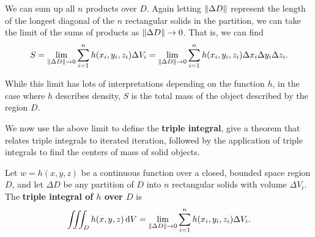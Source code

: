 We can sum up all $n$ products over $D$. Again letting $\left\lVert \Delta D \right\rVert$ represent the length of the longest diagonal of the $n$ rectangular solids in the partition, we can take the limit of the sums of products as $\left\lVert \Delta D \right\rVert\to 0$. That is, we can find
\[S = \lim_{\left\lVert \Delta D \right\rVert\to 0} \sum_{i=1}^n h(x_i,y_i,z_i)\Delta V_i=\lim_{\left\lVert \Delta D \right\rVert\to 0} \sum_{i=1}^n h(x_i,y_i,z_i)\Delta x_i\Delta y_i\Delta z_i.\]

While this limit has lots of interpretations depending on the function $h$, in the case where $h$ describes density, $S$ is the total mass of the object described by the region $D$.

We now use the above limit to define the \textbf{triple integral}, give a theorem that relates triple integrals to iterated iteration, followed by the application of triple integrals to find the centers of mass of solid objects.


\begin{definition}\label{def:triple_integral_3}%
Let $w=h(x,y,z)$ be a continuous function over a closed, bounded space region $D$, and let $\Delta D$ be any partition of $D$ into $n$ rectangular solids with volume $\Delta V_i$. The \textbf{triple integral of $h$ over $D$} is
\[
\iiint_Dh(x,y,z)\operatorname{d}\! V = \lim_{\left\lVert \Delta D \right\rVert\to 0}\sum_{i=1}^n h(x_i,y_i,z_i)\Delta V_i.
\]
\end{definition}

